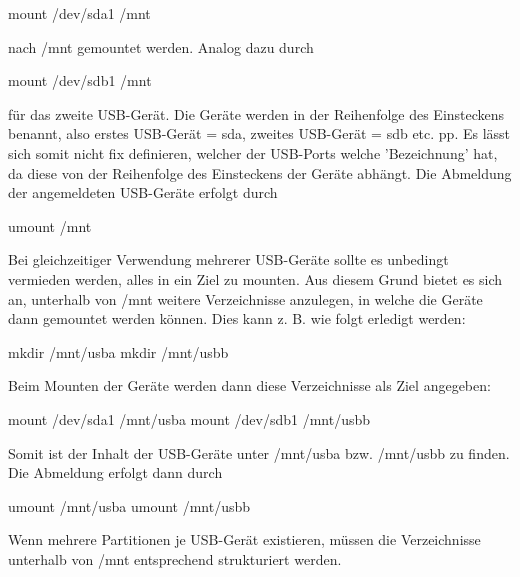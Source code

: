mount /dev/sda1 /mnt

nach /mnt gemountet werden. Analog dazu durch

mount /dev/sdb1 /mnt

für das zweite USB-Gerät. Die Geräte werden in der Reihenfolge des Einsteckens
benannt, also erstes USB-Gerät = sda, zweites USB-Gerät = sdb etc. pp. Es lässt 
sich somit nicht fix definieren, welcher der USB-Ports welche 'Bezeichnung' 
hat, da diese von der Reihenfolge des Einsteckens der Geräte abhängt. 
Die Abmeldung der angemeldeten USB-Geräte erfolgt durch

umount /mnt

Bei gleichzeitiger Verwendung mehrerer USB-Geräte sollte es unbedingt vermieden
werden, alles in ein Ziel zu mounten. Aus diesem Grund bietet es sich an, 
unterhalb von /mnt weitere Verzeichnisse anzulegen, in welche die Geräte dann
gemountet werden können. Dies kann z. B. wie folgt erledigt werden:

mkdir /mnt/usba
mkdir /mnt/usbb

Beim Mounten der Geräte werden dann diese Verzeichnisse als Ziel angegeben:

mount /dev/sda1 /mnt/usba
mount /dev/sdb1 /mnt/usbb

Somit ist der Inhalt der USB-Geräte unter /mnt/usba bzw. /mnt/usbb zu finden.
Die Abmeldung erfolgt dann durch

umount /mnt/usba
umount /mnt/usbb

Wenn mehrere Partitionen je USB-Gerät existieren, müssen die Verzeichnisse 
unterhalb von /mnt entsprechend strukturiert werden.
